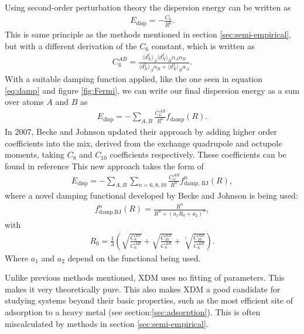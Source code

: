 \documentclass[10pt,a4paper,twocolumn,twoside]{extarticle}
\begin{document}
	Using second-order perturbation theory\cite{XDM-dipole} the dispersion energy can be written as 
	\begin{align}
		E_\text{disp} = -\frac{C_6}{R^6}.
	\end{align}
	This is same principle as the methods mentioned in section \ref{sec:semi-empirical}, but with a different derivation of the $C_6$ constant, which is written as
	\begin{align}
		C_6^{AB} = \frac{\langle d_X^2 \rangle_A \langle d_X^2 \rangle_B \alpha_A \alpha_B}{\langle d_X^2 \rangle_A\alpha_B + \langle d_X^2 \rangle_B\alpha_A}.
	\end{align} 
	With a suitable damping function applied, like the one seen in equation \ref{eq:damp} and figure \ref{fig:Fermi}, we can write our final dispersion energy as a sum over atoms $A$ and $B$ as 
	\begin{align}
		E_\text{disp} = - \sum_{A,B} \frac{C_6^{AB}}{R^6} f_\text{damp}(R).
	\end{align}
	In 2007, Becke and Johnson updated their approach\cite{XDM-Revisited} by adding higher order coefficients into the mix, derived from the exchange quadrupole and octupole moments, taking $C_8$ and $C_{10}$ coefficients respectively. These coefficients can be found in reference \cite{XDM-Revisited} This new approach takes the form of 
	\begin{align}
		E_\text{disp} = -\sum_{A,B} \sum_{n=6,8,10} \frac{C_n^{AB}}{R^n} f^n_\text{damp, BJ}(R),
	\end{align}
	where a novel damping functional developed by Becke and Johnson is being used:\cite{BJ-Damp}
	\begin{align}
		\label{eq:BJ-Damp}
		f^n_\text{damp,BJ} (R) = \frac{R^n}{R^n + (a_1 R_0 + a_2)^n},
	\end{align}
	with
	\begin{align}
		R_0 = \frac{1}{3} \left( \sqrt{\frac{C_8^{AB}}{C_6^{AB}}} + \sqrt{\frac{C_{10}^{AB}}{C_8^{AB}}}
		+ \sqrt[^4]{\frac{C_{10}^{AB}}{C_6^{AB}}} \right).
	\end{align}
	Where $a_1$ and $a_2$ depend on the functional being used.
	
	Unlike previous methods mentioned, XDM uses no fitting of parameters. This makes it very theoretically pure. This also makes XDM a good candidate for studying systems beyond their basic properties, such as the most efficient site of adsorption to a heavy metal (see section:\ref{sec:adsorption}). This is often miscalculated by methods in section \ref{sec:semi-empirical}.
\end{document}
